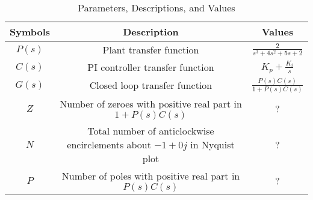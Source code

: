 
\begin{table}[ht!]
\centering
\begin{tabular}{ |c|c|c| } 
 \hline
Symbols & Description & Values  \\
\hline
$P(s)$ & Plant transfer function & $\frac{2}{s^3+4s^2+5s+2}$ \\
 \hline
 $C(s)$ & PI controller transfer function &$K_p+\frac{K_i}{s}$\\
 \hline
$G(s)$ & Closed loop transfer function &$\frac{P(s)C(s)}{1+P(s)C(s)}$\\
 \hline
$Z$ & Number of zeroes with positive real part in $1+P(s)C(s)$ &?\\
 \hline
 $N$ & Total number of anticlockwise encirclements about $-1+0j$ in Nyquist plot & ?\\
\hline
$P$ & Number of poles with positive real part in $P(s)C(s)$ &?\\
\hline
\end{tabular}
\caption{Parameters, Descriptions, and Values}
\label{table:ee25-ec48-gate2021}
\end{table}



